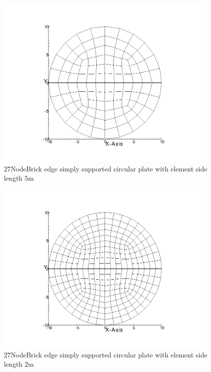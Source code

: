 \documentclass[fleqn,11pt,letter]{article}
\begin{document}
\newpage

\begin{figure}[H]
  \centering
  \includegraphics[width=11cm]{../Figure_files/27NodeBrick/circular_plate2.png}
  \caption{27NodeBrick edge simply supported circular plate with element side length 5m }
  \label{fig 27NodeBrick edges simply supported circular plate with element side length 5m }
\end{figure}


\begin{figure}[H]
  \centering
  \includegraphics[width=11cm]{../Figure_files/27NodeBrick/circular_plate3.png}
  \caption{27NodeBrick edge simply supported circular plate with element side length 2m }
  \label{fig 27NodeBrick edges simply supported circular plate with element side length 2m }
\end{figure}

\newpage
\end{document}
